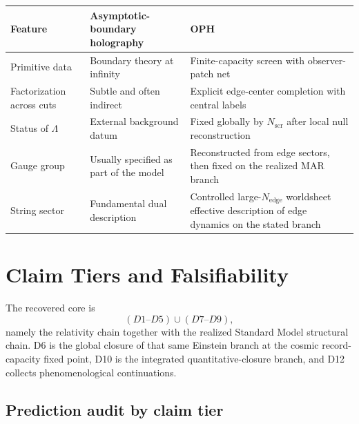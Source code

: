 \documentclass[11pt]{article}
\begin{document}
\begingroup
\footnotesize
\begin{tabular}{@{}>{\raggedright\arraybackslash}p{}>{\raggedright\arraybackslash}p{}>{\raggedright\arraybackslash}p{}@{}}
\toprule
Feature & Asymptotic-boundary holography & OPH \\
\midrule
Primitive data & Boundary theory at infinity & Finite-capacity screen with observer-patch net \\
Factorization across cuts & Subtle and often indirect & Explicit edge-center completion with central labels \\
Status of $\Lambda$ & External background datum & Fixed globally by $N_{\mathrm{scr}}$ after local null reconstruction \\
Gauge group & Usually specified as part of the model & Reconstructed from edge sectors, then fixed on the realized MAR branch \\
String sector & Fundamental dual description & Controlled large-$N_{\mathrm{edge}}$ worldsheet effective description of edge dynamics on the stated branch \\
\bottomrule
\end{tabular}
\endgroup

\section{Claim Tiers and Falsifiability}\label{sec:claim-tiers}

The recovered core is
\[
(D1\text{--}D5)\cup(D7\text{--}D9),
\]
namely the relativity chain together with the realized Standard Model structural chain. D6 is the global closure of that same Einstein branch at the cosmic record-capacity fixed point, D10 is the integrated quantitative-closure branch, and D12 collects phenomenological continuations.

\subsection{Prediction audit by claim tier}
\end{document}
